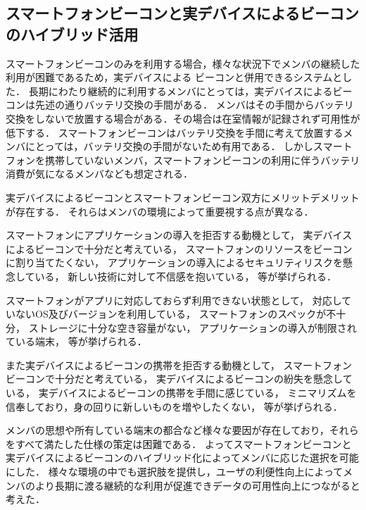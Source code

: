 \subsection{スマートフォンビーコンと実デバイスによるビーコンのハイブリッド活用}
スマートフォンビーコンのみを利用する場合，様々な状況下でメンバの継続した利用が困難であるため，実デバイスによる
ビーコンと併用できるシステムとした．
長期にわたり継続的に利用するメンバにとっては，実デバイスによるビーコンは先述の通りバッテリ交換の手間がある．
メンバはその手間からバッテリ交換をしないで放置する場合がある．その場合は在室情報が記録されず可用性が低下する．
スマートフォンビーコンはバッテリ交換を手間に考えて放置するメンバにとっては，バッテリ交換の手間がないため有用である．
しかしスマートフォンを携帯していないメンバ，スマートフォンビーコンの利用に伴うバッテリ消費が気になるメンバなども想定される．

実デバイスによるビーコンとスマートフォンビーコン双方にメリットデメリットが存在する．
それらはメンバの環境によって重要視する点が異なる．

スマートフォンにアプリケーションの導入を拒否する動機として，
実デバイスによるビーコンで十分だと考えている，
スマートフォンのリソースをビーコンに割り当てたくない，
アプリケーションの導入によるセキュリティリスクを懸念している，
新しい技術に対して不信感を抱いている，
等が挙げられる．

スマートフォンがアプリに対応しておらず利用できない状態として，
対応していないOS及びバージョンを利用している，
スマートフォンのスペックが不十分，
ストレージに十分な空き容量がない，
アプリケーションの導入が制限されている端末，
等が挙げられる．

また実デバイスによるビーコンの携帯を拒否する動機として，
スマートフォンビーコンで十分だと考えている，
実デバイスによるビーコンの紛失を懸念している，
実デバイスによるビーコンの携帯を手間に感じている，
ミニマリズムを信奉しており，身の回りに新しいものを増やしたくない，
等が挙げられる．


メンバの思想や所有している端末の都合など様々な要因が存在しており，それらをすべて満たした仕様の策定は困難である．
よってスマートフォンビーコンと実デバイスによるビーコンのハイブリッド化によってメンバに応じた選択を可能にした．
様々な環境の中でも選択肢を提供し，ユーザの利便性向上によってメンバのより長期に渡る継続的な利用が促進できデータの可用性向上につながると考えた．

